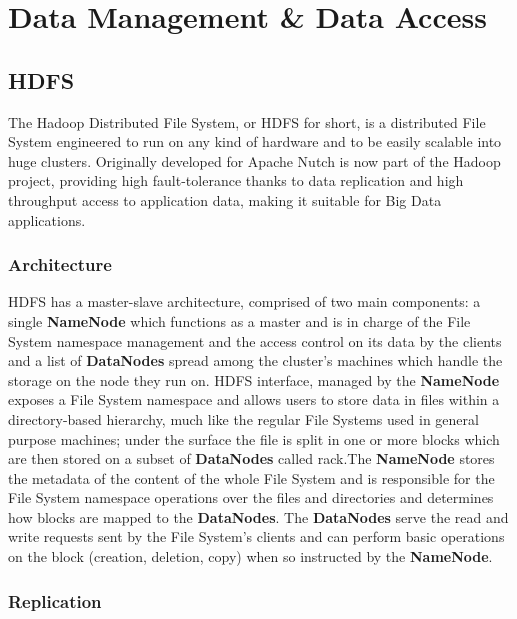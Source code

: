 \chapter{Data Management \& Data Access}

\section{HDFS}

The Hadoop Distributed File System, or HDFS for short, is a distributed File System engineered to run on any kind of hardware and to be easily scalable into huge clusters. Originally developed for Apache Nutch is now part of the Hadoop project, providing high fault-tolerance thanks to data replication and high throughput access to application data, making it suitable for Big Data applications.

\subsection{Architecture} 

HDFS has a master-slave architecture, comprised of two main components: a single \textbf{NameNode} which functions as a master and is in charge of the File System namespace management and the access control on its data by the clients and a list of \textbf{DataNodes} spread among the cluster's machines which handle the storage on the node they run on.\newline
HDFS interface, managed by the \textbf{NameNode} exposes a File System namespace and allows users to store data in files within a directory-based hierarchy, much like the regular File Systems used in general purpose machines; under the surface the file is split in one or more blocks which are then stored on a subset of \textbf{DataNodes} called rack.\newline The \textbf{NameNode} stores the metadata of the content of the whole File System and is responsible for the File System namespace operations over the files and directories and determines how blocks are mapped to the \textbf{DataNodes}.
The \textbf{DataNodes} serve the read and write requests sent by the File System's clients and can perform basic operations on the block (creation, deletion, copy) when so instructed by the \textbf{NameNode}.

\subsection{Replication} 

